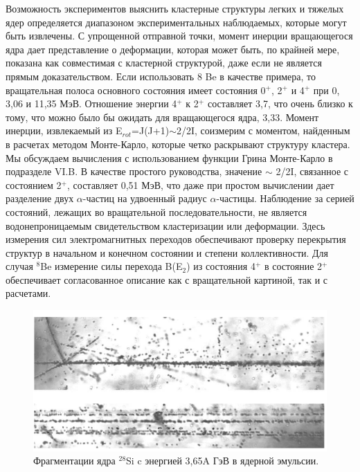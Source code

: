 \documentclass[fontsize=14pt]{scrreport}
\begin{document}
Возможность экспериментов выяснить кластерные структуры легких и тяжелых ядер определяется диапазоном экспериментальных наблюдаемых, которые могут быть извлечены. С упрощенной отправной точки, момент инерции вращающегося ядра дает представление о деформации, которая может быть, по крайней мере, показана как совместимая с кластерной структурой, даже если не является прямым доказательством. Если использовать 8 Be в качестве примера, то вращательная полоса основного состояния имеет состояния 0$^{+}$, 2$^{+}$ и 4$^{+}$ при 0, 3,06 и 11,35 МэВ. Отношение энергии 4$^{+}$ к 2$^{+}$ составляет 3,7, что очень близко к тому, что можно было бы ожидать для вращающегося ядра, 3,33. Момент инерции, извлекаемый из E$_{rot}$=J(J+1)$\sim$2/2I, соизмерим с моментом, найденным в расчетах  методом Монте-Карло, которые четко раскрывают структуру кластера. Мы обсуждаем вычисления с использованием функции Грина Монте-Карло в подразделе VI.B. В качестве простого руководства, значение $\sim$ 2/2I, связанное с состоянием 2$^{+}$, составляет 0,51 МэВ, что даже при простом вычислении дает разделение двух $\alpha$-частиц на удвоенный радиус $\alpha$-частицы. Наблюдение за серией состояний, лежащих во вращательной последовательности, не является водонепроницаемым свидетельством кластеризации или деформации. Здесь измерения сил электромагнитных переходов обеспечивают проверку перекрытия структур в начальном и конечном состоянии и степени коллективности. Для случая $^{8}$Be измерение силы перехода B(E$_{2}$) из состояния 4$^{+}$ в состояние 2$^{+}$ обеспечивает согласованное описание как с вращательной картиной, так и с расчетами.

\begin{figure}[!ht]
\centerline{\includegraphics[scale=.6]{Picture1.png}}
\caption{Фрагментации ядра $^{28}$Si c энергией 3,65A ГэВ в ядерной эмульсии.}
\label{fig1}
\end{figure}
\end{document}
